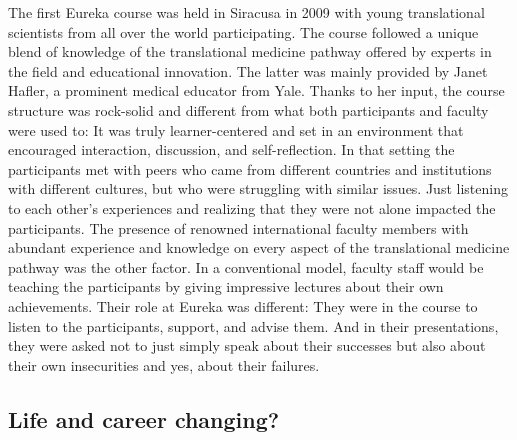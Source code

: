\documentclass[authordate, editorial]{jote-new-article}
\begin{document}
	The first Eureka course was held in Siracusa in 2009 with young translational scientists from all over the world participating. The course followed a unique blend of knowledge of the translational medicine pathway offered by experts in the field and educational innovation. The latter was mainly provided by Janet Hafler, a prominent medical educator from Yale. Thanks to her input, the course structure was rock-solid and different from what both participants and faculty were used to: It was truly learner-centered and set in an environment that encouraged interaction, discussion, and self-reflection. In that setting the participants met with peers who came from different countries and institutions with different cultures, but who were struggling with similar issues. Just listening to each other's experiences and realizing that they were not alone impacted the participants. The presence of renowned international faculty members with abundant experience and knowledge on every aspect of the translational medicine pathway was the other factor. In a conventional model, faculty staff would be teaching the participants by giving impressive lectures about their own achievements. Their role at Eureka was different: They were in the course to listen to the participants, support, and advise them. And in their presentations, they were asked not to just simply speak about their successes but also about their own insecurities and yes, about their failures.



	\subsection{Life and career changing?}
\end{document}
